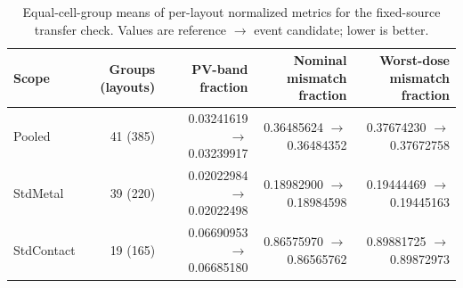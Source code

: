 \documentclass[conference]{IEEEtran}
\begin{document}
\begin{table}[t]
\caption{Equal-cell-group means of per-layout normalized metrics for the fixed-source transfer check. Values are reference $\rightarrow$ event candidate; lower is better.}
\label{tab:transfer}
\centering
\scriptsize
\begin{tabular}{lrrrr}
\hline
Scope & Groups (layouts) & PV-band fraction & Nominal mismatch fraction & Worst-dose mismatch fraction \\
\hline
Pooled & 41 (385) & 0.03241619 $\rightarrow$ 0.03239917 & 0.36485624 $\rightarrow$ 0.36484352 & 0.37674230 $\rightarrow$ 0.37672758 \\
StdMetal & 39 (220) & 0.02022984 $\rightarrow$ 0.02022498 & 0.18982900 $\rightarrow$ 0.18984598 & 0.19444469 $\rightarrow$ 0.19445163 \\
StdContact & 19 (165) & 0.06690953 $\rightarrow$ 0.06685180 & 0.86575970 $\rightarrow$ 0.86565762 & 0.89881725 $\rightarrow$ 0.89872973 \\
\hline
\end{tabular}
\end{table}
\end{document}

